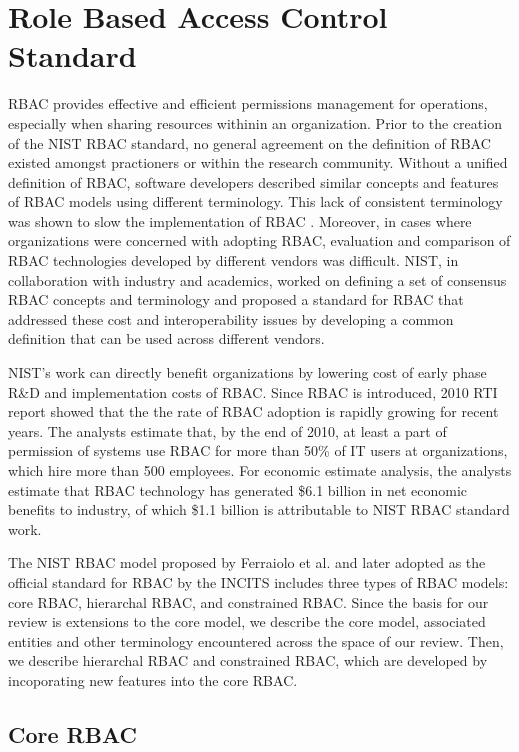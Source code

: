 \section{Role Based Access Control Standard} \label{sec:core-rbac}

RBAC provides effective and efficient permissions management for operations, especially when sharing resources withinin an organization.
Prior to the creation of the NIST RBAC standard, no general agreement on the definition 
of RBAC existed amongst practioners or within the research community. 
Without a unified definition of RBAC, software developers described similar concepts and features of RBAC models using different terminology. 
This lack of consistent terminology was shown to slow the implementation of RBAC \cite{o20102010}.  
Moreover, in cases where organizations were concerned with adopting RBAC,
evaluation and comparison of RBAC technologies developed by different vendors was difficult.
NIST, in collaboration with industry and academics, worked on defining a set of consensus RBAC concepts and terminology and proposed a standard for 
RBAC that addressed these cost and interoperability issues by developing a common definition that can be used across different vendors.

NIST's work can directly benefit organizations by lowering cost of early phase R\&D and implementation costs of RBAC.
Since RBAC is introduced, 2010 RTI report showed that the the rate of RBAC adoption is rapidly growing for recent years. 
The analysts estimate that, by the end of 2010, at least a part of permission of systems use RBAC for more than 50\% of IT users at organizations, which
hire more than 500 employees. For economic estimate analysis, the analysts estimate that RBAC technology has generated \$6.1 billion in net economic benefits to industry, of which \$1.1 billion is attributable to NIST RBAC standard work.

The NIST RBAC model proposed by Ferraiolo et al. \cite{ferraiolo} and later adopted as the official standard for RBAC by the INCITS includes three types of RBAC models: core RBAC, hierarchal RBAC, and constrained RBAC.
Since the basis for our review is extensions to the core model, we describe the core model, associated entities and other terminology encountered across the space of our review. Then, we describe hierarchal RBAC and constrained RBAC, which are developed by incoporating new features into the core RBAC. 

\subsection{Core RBAC} 

